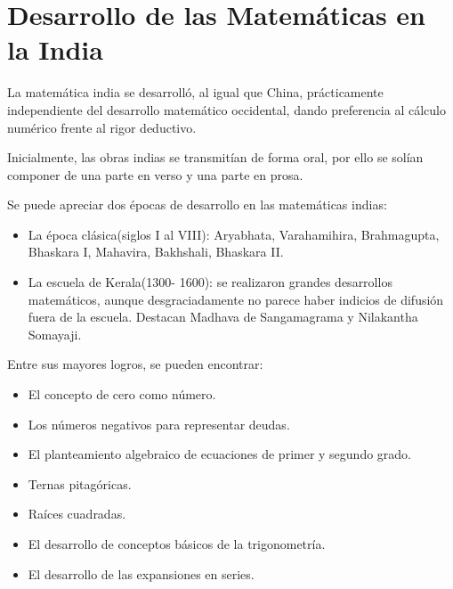\documentclass[12pt, aspectratio=169]{beamer} %
\begin{document}
\section{Desarrollo de las Matemáticas en la India}
	\begin{frame}
		La matemática india se desarrolló, al igual que China, prácticamente independiente del desarrollo matemático
		occidental, dando preferencia al cálculo numérico frente al rigor deductivo.

		Inicialmente, las obras indias se transmitían de forma oral, por ello se solían componer de una parte en verso y
		una parte en prosa.
		
		\pause
		
		Se puede apreciar dos épocas de desarrollo en las matemáticas indias:
		\begin{itemize}
			\item La época clásica(siglos I al VIII): Aryabhata, Varahamihira, Brahmagupta, Bhaskara I, Mahavira,
			Bakhshali, Bhaskara II.
			\item La escuela de Kerala(1300- 1600): se realizaron grandes desarrollos matemáticos, aunque desgraciadamente
			no parece haber indicios de difusión fuera de la escuela. Destacan Madhava de Sangamagrama y Nilakantha Somayaji.
		\end{itemize}
	\end{frame}
	\begin{frame}
		Entre sus mayores logros, se pueden encontrar:
		\begin{itemize}
			\item El concepto de cero como número.
			\item Los números negativos para representar deudas.
			\item El planteamiento algebraico de ecuaciones de primer y segundo grado.
			\item Ternas pitagóricas.
			\item Raíces cuadradas.
			\item El desarrollo de conceptos básicos de la trigonometría.
			\item El desarrollo de las expansiones en series.
		\end{itemize}
	\end{frame}
\end{document}
